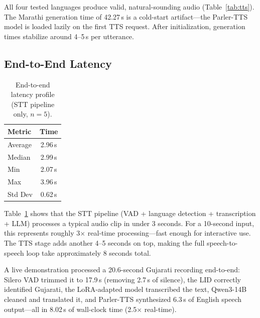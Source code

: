 All four tested languages produce valid, natural-sounding audio (Table~\ref{tab:tts}). The Marathi generation time of 42.27\,s is a cold-start artifact---the Parler-TTS model is loaded lazily on the first TTS request. After initialization, generation times stabilize around 4--5\,s per utterance.

\subsection{End-to-End Latency}

\begin{table}[t]
\centering
\caption{End-to-end latency profile (STT pipeline only, $n = 5$).}
\label{tab:latency}
\begin{tabular}{lc}
\toprule
\textbf{Metric} & \textbf{Time} \\
\midrule
Average  & 2.96\,s \\
Median   & 2.99\,s \\
Min      & 2.07\,s \\
Max      & 3.96\,s \\
Std Dev  & 0.62\,s \\
\bottomrule
\end{tabular}
\end{table}

Table~\ref{tab:latency} shows that the STT pipeline (VAD + language detection + transcription + LLM) processes a typical audio clip in under 3 seconds. For a 10-second input, this represents roughly 3$\times$ real-time processing---fast enough for interactive use. The TTS stage adds another 4--5 seconds on top, making the full speech-to-speech loop take approximately 8 seconds total.

A live demonstration processed a 20.6-second Gujarati recording end-to-end: Silero VAD trimmed it to 17.9\,s (removing 2.7\,s of silence), the LID correctly identified Gujarati, the LoRA-adapted model transcribed the text, Qwen3-14B cleaned and translated it, and Parler-TTS synthesized 6.3\,s of English speech output---all in 8.02\,s of wall-clock time (2.5$\times$ real-time).
